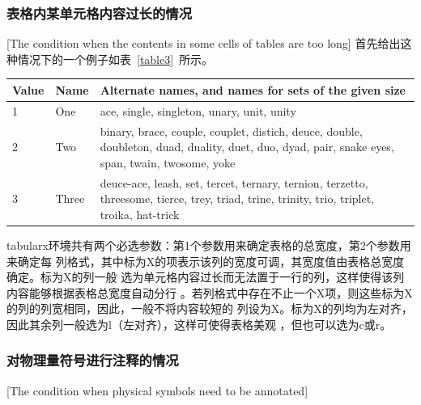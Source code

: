 \subsubsection{表格内某单元格内容过长的情况}[The condition when the contents in
some cells of tables are too long]
首先给出这种情况下的一个例子如表~\ref{table3}~所示。
\begin{table}[htbp]
  \centering
{}\vspace{0.5em}\wuhao
\begin{tabularx}{0.7\textwidth}{llX}
\toprule[1.5pt]
Value & Name & Alternate names, and names for sets of the given size\\\midrule[1pt]
1 & One & ace, single, singleton, unary, unit, unity\\
2 & Two & binary, brace, couple, couplet, distich, deuce, double, doubleton, duad, duality, duet, duo, dyad, pair, snake eyes, span, twain, twosome, yoke\\
3 & Three & deuce-ace, leash, set, tercet, ternary, ternion, terzetto, threesome, tierce, trey, triad, trine, trinity, trio, triplet, troika, hat-trick\\\bottomrule[1.5pt]
\end{tabularx}
\end{table}
tabularx环境共有两个必选参数：第1个参数用来确定表格的总宽度，第2个参数用来确定每
列格式，其中标为X的项表示该列的宽度可调，其宽度值由表格总宽度确定。标为X的列一般
选为单元格内容过长而无法置于一行的列，这样使得该列内容能够根据表格总宽度自动分行
。若列格式中存在不止一个X项，则这些标为X的列的列宽相同，因此，一般不将内容较短的
列设为X。标为X的列均为左对齐，因此其余列一般选为l（左对齐），这样可使得表格美观
，但也可以选为c或r。

\subsubsection{对物理量符号进行注释的情况}[The condition when physical symbols
need to be annotated]


